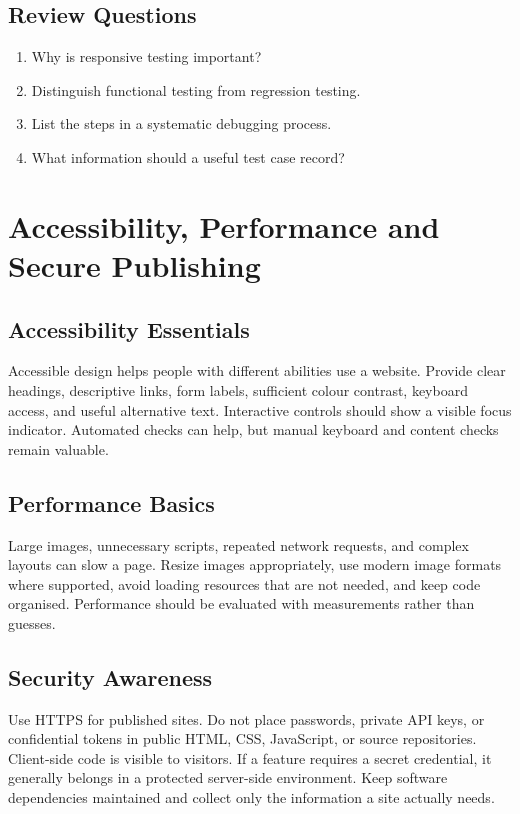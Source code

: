 \documentclass[11pt,openany,oneside]{book}
\begin{document}
\section*{Review Questions}
\begin{enumerate}
\item Why is responsive testing important?
\item Distinguish functional testing from regression testing.
\item List the steps in a systematic debugging process.
\item What information should a useful test case record?
\end{enumerate}

\chapter{Accessibility, Performance and Secure Publishing}
\section{Accessibility Essentials}
Accessible design helps people with different abilities use a website. Provide clear headings, descriptive links, form labels, sufficient colour contrast, keyboard access, and useful alternative text. Interactive controls should show a visible focus indicator. Automated checks can help, but manual keyboard and content checks remain valuable.

\section{Performance Basics}
Large images, unnecessary scripts, repeated network requests, and complex layouts can slow a page. Resize images appropriately, use modern image formats where supported, avoid loading resources that are not needed, and keep code organised. Performance should be evaluated with measurements rather than guesses.

\section{Security Awareness}
Use HTTPS for published sites. Do not place passwords, private API keys, or confidential tokens in public HTML, CSS, JavaScript, or source repositories. Client-side code is visible to visitors. If a feature requires a secret credential, it generally belongs in a protected server-side environment. Keep software dependencies maintained and collect only the information a site actually needs.
\end{document}
